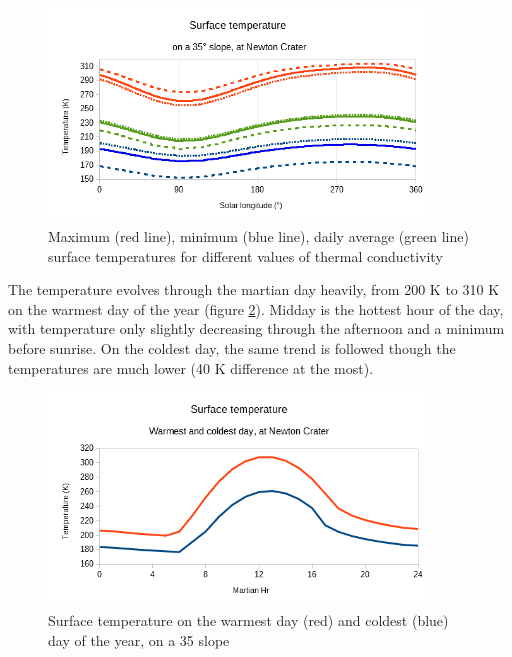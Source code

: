 \documentclass{report}
\begin{document}
\begin{figure}
    \centering
    \includegraphics[width=0.9\textwidth]{graphs/0108-newton-diffk.png}
    \caption{Maximum (red line), minimum (blue line), daily average (green line) surface temperatures for different values of thermal conductivity}
    \label{diffknewton}
\end{figure}{}

The temperature evolves through the martian day heavily, from 200 K to 310 K on the warmest day of the year (figure \ref{hourlynewton}). Midday is the hottest hour of the day, with temperature only slightly decreasing through the afternoon and a minimum before sunrise. On the coldest day, the same trend is followed though the temperatures are much lower (40 K difference at the most). \\
\begin{figure}
    \centering
    \includegraphics[width=0.9\textwidth]{graphs/0108-newton-hourly.png}
    \caption{Surface temperature on the warmest day (red) and coldest (blue) day of the year, on a 35 \degree slope}
    \label{hourlynewton}
\end{figure}{}
\end{document}
